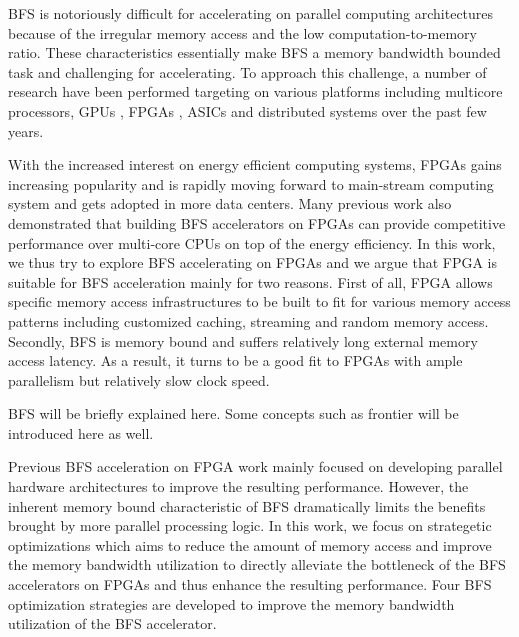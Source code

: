 \documentclass[12pt]{article} %
\begin{document}
BFS is notoriously difficult for accelerating on parallel computing architectures 
because of the irregular memory access and the low computation-to-memory ratio. 
These characteristics essentially make BFS a memory bandwidth bounded task and 
challenging for accelerating. To approach this challenge, a number of research 
have been performed targeting on various platforms including multicore processors, 
GPUs \cite{liu2015enterprise}, FPGAs \cite{attia2014cygraph, betkaoui2012reconfigurable, 
umuroglu2015hybrid, oguntebi2016graphops, engelhardt2016gravf}, ASICs 
\cite{ham2016graphicionadoand} and distributed systems over the past few years. 

With the increased interest on energy efficient computing systems, 
FPGAs gains increasing popularity and is rapidly moving forward to 
main-stream computing system and gets adopted in more data centers. 
Many previous work also demonstrated that building BFS accelerators 
on FPGAs can provide competitive performance over multi-core CPUs 
on top of the energy efficiency. In this work, we thus try to explore 
BFS accelerating on FPGAs and we 
argue that FPGA is suitable for BFS acceleration mainly for two reasons. 
First of all, FPGA allows specific memory access infrastructures to be 
built to fit for various memory access patterns including customized caching, 
streaming and random memory access. Secondly, BFS is memory bound and suffers 
relatively long external memory access latency. As a result, it turns to be a 
good fit to FPGAs with ample parallelism but relatively slow clock speed.

BFS will be briefly explained here. Some concepts such as frontier will be 
introduced here as well.

Previous BFS acceleration on FPGA work mainly focused on developing parallel 
hardware architectures to improve the resulting performance. However, the inherent 
memory bound characteristic of BFS dramatically limits the benefits brought by more parallel 
processing logic. In this work, we focus on strategetic optimizations which aims to 
reduce the amount of memory access and improve the memory bandwidth utilization 
to directly alleviate the bottleneck of the BFS accelerators on FPGAs and thus 
enhance the resulting performance. Four BFS optimization strategies 
are developed to improve the memory bandwidth utilization of the BFS accelerator. 
\end{document}
